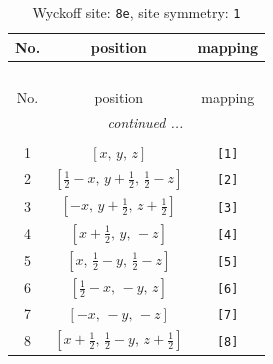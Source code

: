 \documentclass[fleqn,8pt]{jsarticle}
\begin{document}
\renewcommand{\arraystretch}{1.2}
\begin{longtable}{ccc}
\caption{Wyckoff site: {\tt 8e}, site symmetry: {\tt 1}}
 \\
 \hline \hline
No. & position & mapping \\ \hline \endfirsthead

\multicolumn{2}{l}{\tablename\ \thetable{}} \\
 \hline \hline
No. & position & mapping \\ \hline \endhead

 \hline \hline
\multicolumn{2}{r}{\footnotesize\it continued ...} \\ \endfoot

 \hline \hline
\multicolumn{2}{r}{} \\ \endlastfoot

1 & $\left[ x,\, y,\, z \right]$ & {\tt [1]} \\ \hline
2 & $\left[ \frac{1}{2} - x,\, y + \frac{1}{2},\, \frac{1}{2} - z \right]$ & {\tt [2]} \\ \hline
3 & $\left[ - x,\, y + \frac{1}{2},\, z + \frac{1}{2} \right]$ & {\tt [3]} \\ \hline
4 & $\left[ x + \frac{1}{2},\, y,\, - z \right]$ & {\tt [4]} \\ \hline
5 & $\left[ x,\, \frac{1}{2} - y,\, \frac{1}{2} - z \right]$ & {\tt [5]} \\ \hline
6 & $\left[ \frac{1}{2} - x,\, - y,\, z \right]$ & {\tt [6]} \\ \hline
7 & $\left[ - x,\, - y,\, - z \right]$ & {\tt [7]} \\ \hline
8 & $\left[ x + \frac{1}{2},\, \frac{1}{2} - y,\, z + \frac{1}{2} \right]$ & {\tt [8]} \\
\end{longtable}
\end{document}

